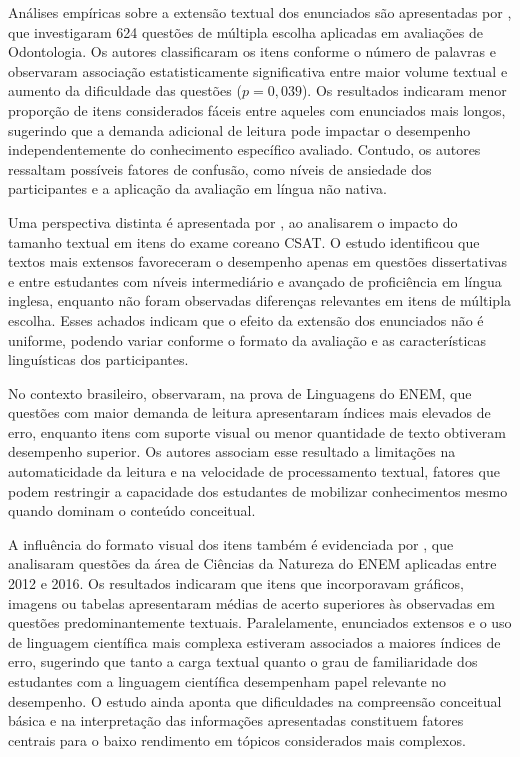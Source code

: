 \documentclass[a4paper,10pt, twocolumn]{article}
\begin{document}
Análises empíricas sobre a extensão textual dos enunciados são apresentadas por \textcite{Pullishery2020}, que investigaram 624 questões de múltipla escolha aplicadas em avaliações de Odontologia. Os autores classificaram os itens conforme o número de palavras e observaram associação estatisticamente significativa entre maior volume textual e aumento da dificuldade das questões ($p = 0{,}039$). Os resultados indicaram menor proporção de itens considerados fáceis entre aqueles com enunciados mais longos, sugerindo que a demanda adicional de leitura pode impactar o desempenho independentemente do conhecimento específico avaliado. Contudo, os autores ressaltam possíveis fatores de confusão, como níveis de ansiedade dos participantes e a aplicação da avaliação em língua não nativa.

Uma perspectiva distinta é apresentada por \textcite{2018}, ao analisarem o impacto do tamanho textual em itens do exame coreano CSAT. O estudo identificou que textos mais extensos favoreceram o desempenho apenas em questões dissertativas e entre estudantes com níveis intermediário e avançado de proficiência em língua inglesa, enquanto não foram observadas diferenças relevantes em itens de múltipla escolha. Esses achados indicam que o efeito da extensão dos enunciados não é uniforme, podendo variar conforme o formato da avaliação e as características linguísticas dos participantes.

No contexto brasileiro, \textcite{silva2019desempenho} observaram, na prova de Linguagens do ENEM, que questões com maior demanda de leitura apresentaram índices mais elevados de erro, enquanto itens com suporte visual ou menor quantidade de texto obtiveram desempenho superior. Os autores associam esse resultado a limitações na automaticidade da leitura e na velocidade de processamento textual, fatores que podem restringir a capacidade dos estudantes de mobilizar conhecimentos mesmo quando dominam o conteúdo conceitual.

A influência do formato visual dos itens também é evidenciada por \textcite{Cestaro2020}, que analisaram questões da área de Ciências da Natureza do ENEM aplicadas entre 2012 e 2016. Os resultados indicaram que itens que incorporavam gráficos, imagens ou tabelas apresentaram médias de acerto superiores às observadas em questões predominantemente textuais. Paralelamente, enunciados extensos e o uso de linguagem científica mais complexa estiveram associados a maiores índices de erro, sugerindo que tanto a carga textual quanto o grau de familiaridade dos estudantes com a linguagem científica desempenham papel relevante no desempenho. O estudo ainda aponta que dificuldades na compreensão conceitual básica e na interpretação das informações apresentadas constituem fatores centrais para o baixo rendimento em tópicos considerados mais complexos.
\end{document}
